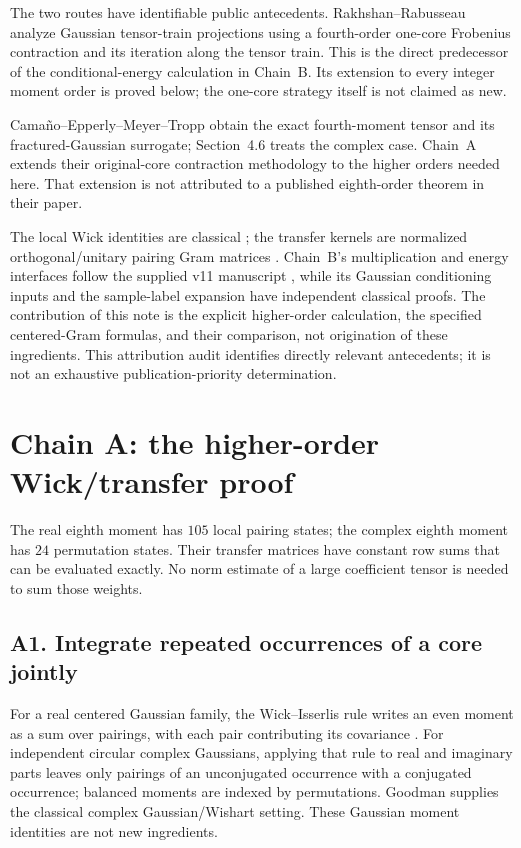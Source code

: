 \documentclass[11pt]{article}
\numberwithin{equation}{section}
\theoremstyle{definition}\newtheorem{definition}[theorem]{Definition}
\theoremstyle{remark}\newtheorem{remark}[theorem]{Remark}
\begin{document}
The two routes have identifiable public antecedents. Rakhshan--Rabusseau
\cite[Theorem~1 and Section~5.1, Lemmas~3--4]{RR2020} analyze Gaussian tensor-train
projections using a fourth-order one-core Frobenius contraction and its iteration
along the tensor train. This is the direct predecessor of the conditional-energy
calculation in Chain~B. Its extension to every integer moment order is proved
below; the one-core strategy itself is not claimed as new.

Cama\~no--Epperly--Meyer--Tropp
\cite[Section~4.4.1, equation~(4.8), and Theorems~4.3--4.4]{CEMT}
obtain the exact fourth-moment tensor and its fractured-Gaussian surrogate;
Section~4.6 treats the complex case. Chain~A extends their original-core
contraction methodology to the higher orders needed here. That extension is
not attributed to a published eighth-order theorem in their paper.

The local Wick identities are classical \cite{Isserlis,Goodman}; the transfer
kernels are normalized orthogonal/unitary pairing Gram matrices
\cite[Section~2]{CollinsMatsumoto}. Chain~B's multiplication and energy interfaces
follow the supplied v11 manuscript \cite{Framework}, while its Gaussian
conditioning inputs and the sample-label expansion have independent classical
proofs. The contribution of this note is the explicit higher-order calculation,
the specified centered-Gram formulas, and their comparison, not origination of
these ingredients. This attribution audit identifies directly relevant
antecedents; it is not an exhaustive publication-priority determination.

\par{}
\section{Chain A: the higher-order Wick/transfer proof}\label{sec:A}
\begin{takeaway}
The real eighth moment has $105$ local pairing states; the complex eighth moment
has $24$ permutation states. Their transfer matrices have constant row sums that
can be evaluated exactly. No norm estimate of a large coefficient tensor is needed
to sum those weights.
\end{takeaway}

\subsection{A1. Integrate repeated occurrences of a core jointly}
For a real centered Gaussian family, the Wick--Isserlis rule writes an even
moment as a sum over pairings, with each pair contributing its covariance
\cite{Isserlis}. For independent circular complex Gaussians, applying that rule
to real and imaginary parts leaves only pairings of an unconjugated occurrence
with a conjugated occurrence; balanced moments are indexed by permutations.
Goodman \cite{Goodman} supplies the classical complex Gaussian/Wishart setting.
These Gaussian moment identities are not new ingredients.
\end{document}

